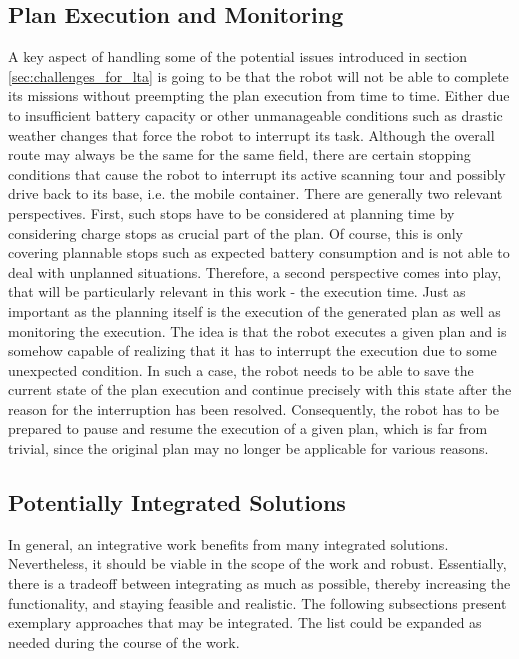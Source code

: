 \documentclass[english, master, expose, utf8]{base/thesis_KBS}
\begin{document}
\subsection{Plan Execution and Monitoring}

A key aspect of handling some of the potential issues introduced in section \ref{sec:challenges_for_lta} is going to be that the robot will not be able to
complete its missions without preempting the plan execution from time to time. Either due to insufficient battery capacity or other unmanageable conditions such as 
drastic weather changes that force the robot to interrupt its task. Although the overall route may always be the same for the same field, there are certain stopping
conditions that cause the robot to interrupt its active scanning tour and possibly drive back to its base, i.e. the mobile container.
There are generally two relevant perspectives. First, such stops have to be considered at planning time by considering charge stops as crucial part of the plan.
Of course, this is only covering plannable stops such as expected battery consumption and is not able to deal with unplanned situations.
Therefore, a second perspective comes into play, that will be particularly relevant in this work - the execution time.
Just as important as the planning itself is the execution of the generated plan as well as monitoring the execution.
The idea is that the robot executes a given plan and is somehow capable of realizing that it has to interrupt the execution due to some unexpected condition.
In such a case, the robot needs to be able to save the current state of the plan execution and continue precisely with this state after the reason 
for the interruption has been resolved. Consequently, the robot has to be prepared to pause and resume the execution of a given plan, which is far from 
trivial, since the original plan may no longer be applicable for various reasons.

\subsection{Potentially Integrated Solutions}

In general, an integrative work benefits from many integrated solutions. Nevertheless, it should be viable in the scope of the work and robust.
Essentially, there is a tradeoff between integrating as much as possible, thereby increasing the functionality, and staying feasible and realistic.
The following subsections present exemplary approaches that may be integrated. The list could be expanded as needed during the course of the work.
\end{document}
